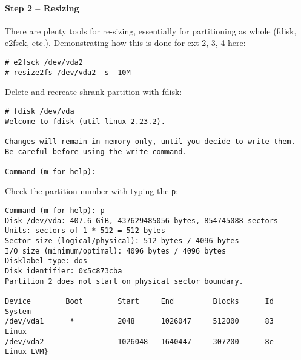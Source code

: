 \paragraph{Step 2 -- Resizing}
There are plenty tools for re-sizing, essentially for partitioning as whole (fdisk, e2fsck, etc.).
Demonstrating how this is done for ext 2, 3, 4 here:
\begin{lstlisting}[columns=fixed,basicstyle=\ttfamily\footnotesize,tabsize=4,backgroundcolor=\color{yellow!10}]
# e2fsck /dev/vda2
# resize2fs /dev/vda2 -s -10M
\end{lstlisting}
Delete and recreate shrank partition with fdisk:
\begin{lstlisting}[columns=fixed,basicstyle=\ttfamily\footnotesize,tabsize=4,backgroundcolor=\color{yellow!10}]
# fdisk /dev/vda
Welcome to fdisk (util-linux 2.23.2).

Changes will remain in memory only, until you decide to write them.
Be careful before using the write command.

Command (m for help):
\end{lstlisting}
Check the partition number with typing the {\tt p}:
\begin{lstlisting}[columns=fixed,basicstyle=\ttfamily\footnotesize,tabsize=4,backgroundcolor=\color{yellow!10}]
Command (m for help): p
Disk /dev/vda: 407.6 GiB, 437629485056 bytes, 854745088 sectors
Units: sectors of 1 * 512 = 512 bytes
Sector size (logical/physical): 512 bytes / 4096 bytes
I/O size (minimum/optimal): 4096 bytes / 4096 bytes
Disklabel type: dos
Disk identifier: 0x5c873cba
Partition 2 does not start on physical sector boundary.

Device        Boot        Start     End         Blocks      Id    System
/dev/vda1      *          2048      1026047     512000      83    Linux
/dev/vda2                 1026048   1640447     307200      8e    Linux LVM}
\end{lstlisting}



